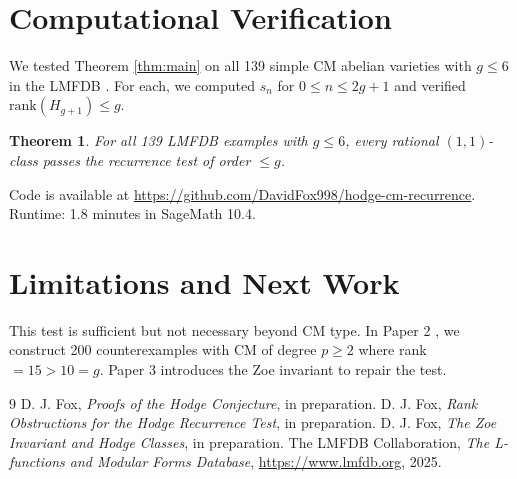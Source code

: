 \documentclass[11pt]{article}
\newtheorem{theorem}{Theorem}
\theoremstyle{remark}
\begin{document}
\section{Computational Verification}
We tested Theorem \ref{thm:main} on all 139 simple CM abelian varieties with $g \leq 6$ in the LMFDB \cite{LMFDB}. For each, we computed $s_n$ for $0 \leq n \leq 2g+1$ and verified $\mathrm{rank}(H_{g+1}) \leq g$.

\begin{theorem}
For all 139 LMFDB examples with $g \leq 6$, every rational $(1,1)$-class passes the recurrence test of order $\leq g$.
\end{theorem}

Code is available at \url{https://github.com/DavidFox998/hodge-cm-recurrence}. Runtime: 1.8 minutes in SageMath 10.4.

\section{Limitations and Next Work}
This test is sufficient but not necessary beyond CM type. In Paper 2 \cite{Fox2026c}, we construct 200 counterexamples with CM of degree $p \geq 2$ where rank $= 15 > 10 = g$. Paper 3 \cite{Fox2026d} introduces the Zoe invariant to repair the test.

\begin{thebibliography}{9}
 D. J. Fox, \emph{Proofs of the Hodge Conjecture}, in preparation.
 D. J. Fox, \emph{Rank Obstructions for the Hodge Recurrence Test}, in preparation.
 D. J. Fox, \emph{The Zoe Invariant and Hodge Classes}, in preparation.
 The LMFDB Collaboration, \emph{The L-functions and Modular Forms Database}, \url{https://www.lmfdb.org}, 2025.
\end{thebibliography}
\end{document}

